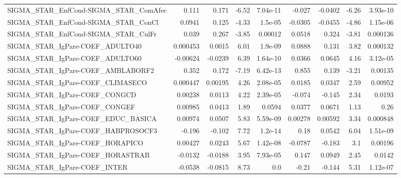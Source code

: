 \begin{tabular}{lrrrrrrrr}
SIGMA\_STAR\_EnfCond-SIGMA\_STAR\_ComAfec  &       0.111 &        0.171 &    -6.52 & 7.04e-11 &     -0.027 &     -0.0402 &        -6.26 &      3.93e-10 \\
SIGMA\_STAR\_EnfCond-SIGMA\_STAR\_ConCl    &      0.0941 &        0.125 &    -4.33 &  1.5e-05 &    -0.0305 &     -0.0455 &        -4.86 &      1.15e-06 \\
SIGMA\_STAR\_EnfCond-SIGMA\_STAR\_CulFr    &       0.039 &        0.267 &    -3.85 &  0.00012 &     0.0518 &       0.324 &        -3.81 &      0.000136 \\
SIGMA\_STAR\_IgPare-COEF\_ADULTO40        &    0.000453 &       0.0015 &     6.01 &  1.9e-09 &     0.0888 &       0.131 &         3.82 &      0.000132 \\
SIGMA\_STAR\_IgPare-COEF\_ADULTO60        &    -0.00624 &      -0.0239 &     6.39 & 1.64e-10 &     0.0366 &      0.0645 &         4.16 &      3.12e-05 \\
SIGMA\_STAR\_IgPare-COEF\_AMBLABORF2      &       0.352 &        0.172 &    -7.19 & 6.42e-13 &      0.855 &       0.139 &        -3.21 &       0.00135 \\
SIGMA\_STAR\_IgPare-COEF\_CLIMASECO       &    0.000447 &      0.00195 &     4.26 & 2.08e-05 &     0.0185 &      0.0347 &         2.59 &       0.00952 \\
SIGMA\_STAR\_IgPare-COEF\_CONGCD          &     0.00238 &       0.0113 &     4.22 & 2.39e-05 &     -0.074 &      -0.145 &         2.34 &        0.0193 \\
SIGMA\_STAR\_IgPare-COEF\_CONGEF          &     0.00985 &       0.0413 &     1.89 &   0.0594 &     0.0377 &      0.0671 &         1.13 &          0.26 \\
SIGMA\_STAR\_IgPare-COEF\_EDUC\_BASICA     &     0.00974 &       0.0507 &     5.83 & 5.59e-09 &    0.00278 &     0.00592 &         3.34 &      0.000848 \\
SIGMA\_STAR\_IgPare-COEF\_HABPROSOCF3     &      -0.196 &       -0.102 &     7.72 &  1.2e-14 &       0.18 &      0.0542 &         6.04 &      1.51e-09 \\
SIGMA\_STAR\_IgPare-COEF\_HORAPICO        &     0.00427 &       0.0243 &     5.67 & 1.42e-08 &    -0.0787 &      -0.183 &          3.1 &       0.00196 \\
SIGMA\_STAR\_IgPare-COEF\_HORASTRAB       &     -0.0132 &      -0.0188 &     3.95 & 7.93e-05 &      0.147 &      0.0949 &         2.45 &        0.0142 \\
SIGMA\_STAR\_IgPare-COEF\_INTER           &     -0.0538 &      -0.0815 &     8.73 &      0.0 &      -0.21 &      -0.144 &         5.31 &      1.12e-07 \\

\end{tabular}
